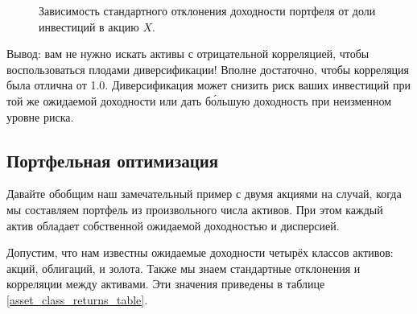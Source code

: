 \begin{figure}[h]
\centering
{}
\caption{Зависимость стандартного отклонения доходности портфеля от доли 
инвестиций в акцию $X$.}
\label{portfolio_volatility_vs_w}
\end{figure}

Вывод: вам не нужно искать активы с отрицательной корреляцией, чтобы 
воспользоваться плодами диверсификации! Вполне достаточно, чтобы корреляция была 
отлична от 1.0. Диверсификация может снизить риск ваших инвестиций при той же 
ожидаемой доходности или дать б\'{о}льшую доходность при неизменном уровне 
риска.

\subsection{Портфельная оптимизация}

Давайте обобщим наш замечательный пример с двумя акциями на случай, когда мы 
составляем портфель из произвольного числа активов. При этом каждый актив 
обладает собственной ожидаемой доходностью и дисперсией.

Допустим, что нам известны ожидаемые доходности четырёх классов активов: акций, 
облигаций,  и золота. Также мы знаем стандартные отклонения и корреляции между 
активами. Эти значения приведены в таблице \ref{asset_class_returns_table}.

